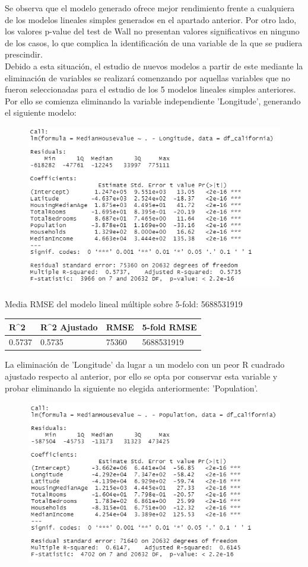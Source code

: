 Se observa que el modelo generado ofrece mejor rendimiento frente a cualquiera de los modelos lineales simples generados en el apartado anterior. Por otro lado, los valores p-value del test de Wall no presentan valores significativos en ninguno de los casos, lo que complica la identificación de una variable de la que se pudiera prescindir.\\

Debido a esta situación, el estudio de nuevos modelos a partir de este mediante la eliminación de variables se realizará comenzando por aquellas variables que no fueron seleccionadas para el estudio de los 5 modelos lineales simples anteriores. \\

Por ello se comienza eliminando la variable independiente 'Longitude', generando el siguiente modelo:
\begin{figure}[!h]
	\centering
	\includegraphics[width=0.7\linewidth]{figures/fit_multi_2}
	\caption{}
	\label{fig:fitmulti2}
\end{figure}

Media RMSE del modelo lineal múltiple sobre 5-fold: 5688531919
\vspace{0.5cm}
\begin{table}[!h]
	\centering
	\begin{tabular}{llll}
		R\textasciicircum{}2 & R\textasciicircum{}2 Ajustado & RMSE  & 5-fold RMSE \\ \hline
		0.5737               & 0.5735                        & 75360 & 5688531919 
	\end{tabular}
\end{table}

La eliminación de 'Longitude' da lugar a un modelo con un peor R cuadrado ajustado respecto al anterior, por ello se opta por conservar esta variable y probar eliminando la siguiente no elegida anteriormente: 'Population'.
\begin{figure}[!h]
	\centering
	\includegraphics[width=0.7\linewidth]{figures/fit_multi_3}
	\caption{}
	\label{fig:fitmulti3}
\end{figure}

